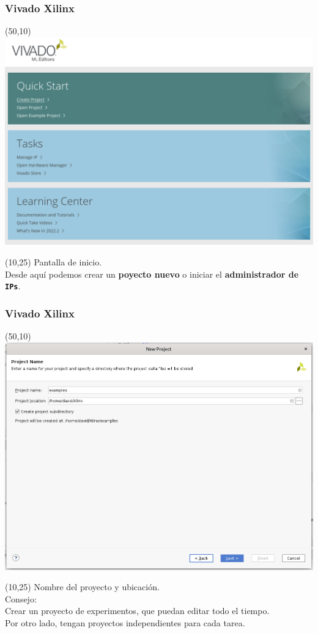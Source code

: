 \documentclass[aspectratio=169]{beamer}
\begin{document}
\begin{frame}[fragile,t]
    \frametitle{Vivado Xilinx}
    \begin{textblock}{75}(50,10) \includegraphics[scale=0.27]{img/vivado/01_start_page.png} \end{textblock}
    \begin{textblock}{38}(10,25) \small
     Pantalla de inicio.\\
     Desde aquí podemos crear un \textbf{poyecto nuevo} o iniciar el \textbf{administrador de \texttt{IPs}}.
    \end{textblock}
\end{frame}

\begin{frame}[fragile,t]
    \frametitle{Vivado Xilinx}
    \begin{textblock}{75}(50,10) \includegraphics[scale=0.27]{img/vivado/02_new_proyect.png} \end{textblock}
    \begin{textblock}{38}(10,25) \small
     Nombre del proyecto y ubicación.\\
     \bigskip
     \textcolor{verdeuca}{Consejo:\\ Crear un proyecto de experimentos, que puedan editar todo el tiempo.\\ Por otro lado, tengan proyectos independientes para cada tarea.}
    \end{textblock}
\end{frame}
    
\end{document}

